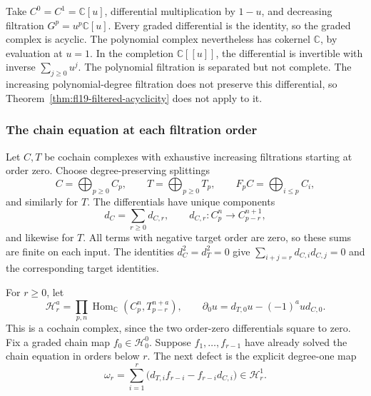 \begin{example}\label{ex:fl19-completion}
Take $C^0=C^1=\mathbb C[u]$, differential multiplication by $1-u$, and decreasing filtration $G^p=u^p\mathbb C[u]$.
Every graded differential is the identity, so the graded complex is acyclic.
The polynomial complex nevertheless has cokernel $\mathbb C$, by evaluation at $u=1$.
In the completion $\mathbb C[[u]]$, the differential is invertible with inverse $\sum_{j\ge0}u^j$.
The polynomial filtration is separated but not complete.
The increasing polynomial-degree filtration does not preserve this differential, so Theorem~\ref{thm:fl19-filtered-acyclicity} does not apply to it.
\end{example}

\subsubsection{The chain equation at each filtration order}

Let $C,T$ be cochain complexes with exhaustive increasing filtrations starting at order zero.
Choose degree-preserving splittings
\[
C=\bigoplus_{p\ge0}C_p,\qquad T=\bigoplus_{p\ge0}T_p,
\qquad F_pC=\bigoplus_{i\le p}C_i,
\]
and similarly for $T$.
The differentials have unique components
\[
d_C=\sum_{r\ge0}d_{C,r},\qquad d_{C,r}:C_p^n\to C_{p-r}^{n+1},
\]
and likewise for $T$.
All terms with negative target order are zero, so these sums are finite on each input.
The identities $d_C^2=d_T^2=0$ give
$\sum_{i+j=r}d_{C,i}d_{C,j}=0$ and the corresponding target identities.

For $r\ge0$, let
\[
\mathcal H_r^a=\prod_{p,n}\operatorname{Hom}_{\mathbb C}(C_p^n,T_{p-r}^{n+a}),
\qquad \partial_0u=d_{T,0}u-(-1)^a u d_{C,0}.
\]
This is a cochain complex, since the two order-zero differentials square to zero.
Fix a graded chain map $f_0\in\mathcal H_0^0$.
Suppose $f_1,\ldots,f_{r-1}$ have already solved the chain equation in orders below $r$.
The next defect is the explicit degree-one map
\begin{equation}\label{eq:fl19-obstruction}
\omega_r=\sum_{i=1}^{r}
\bigl(d_{T,i}f_{r-i}-f_{r-i}d_{C,i}\bigr)\in\mathcal H_r^1.
\end{equation}

